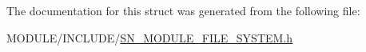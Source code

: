 The documentation for this struct was generated from the following file\+:\begin{DoxyCompactItemize}
\item 
M\+O\+D\+U\+L\+E/\+I\+N\+C\+L\+U\+D\+E/\hyperlink{SN__MODULE__FILE__SYSTEM_8h}{S\+N\+\_\+\+M\+O\+D\+U\+L\+E\+\_\+\+F\+I\+L\+E\+\_\+\+S\+Y\+S\+T\+E\+M.\+h}\end{DoxyCompactItemize}

